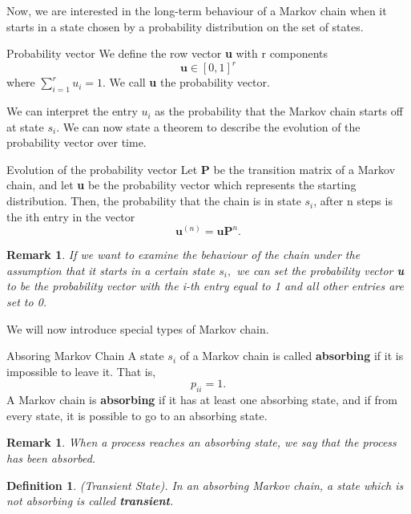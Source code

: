 \documentclass[twoside]{article}
\newtheorem{definition}[theorem]{Definition}
\newtheorem{remark}[theorem]{Remark}
\begin{document}
Now, we are interested in the long-term behaviour of a Markov chain when it starts in a state chosen by a probability distribution on the set of states. 

\begin{definition_exam}{Probability vector}{}
We define the row vector \textbf{u} with r components 
$$
\textbf{u} \in [0, 1]^r
$$
where $\sum_{i=1}^{r}u_i = 1$. We call \textbf{u} the probability vector.
\end{definition_exam}

We can interpret the entry $u_i$ as the probability that the Markov chain starts off at state $s_i.$ We can now state a theorem to describe the evolution of the probability vector over time.

\begin{theorem_exam}{Evolution of the probability vector}{} Let \textbf{P} be the transition matrix of a Markov chain, and let \textbf{u} be the probability vector which represents the starting distribution. Then, the probability that the chain is in state $s_i$, after n steps is the ith entry in the vector 
$$
\textbf{u}^{(n)} = \textbf{u}\textbf{P}^n.
$$
\end{theorem_exam}

\begin{remark} If we want to examine the behaviour of the chain under the assumption that it starts in a certain state $s_i,$ we can set the probability vector \textbf{u} to be the probability vector with the i-th entry equal to 1 and all other entries are set to 0.
\end{remark}

We will now introduce special types of Markov chain.

\begin{definition_exam}{Absoring Markov Chain}{} A state $s_i$ of a Markov chain is called \textbf{absorbing} if it is impossible to leave it. That is, 
$$
p_{ii} = 1.
$$
A Markov chain is \textbf{absorbing} if it has at least one absorbing state, and if from every state, it is possible to go to an absorbing state.
\end{definition_exam}

\begin{remark} When a process reaches an absorbing state, we say that the process has been absorbed.
\end{remark}

\begin{definition}(Transient State). In an absorbing Markov chain, a state which is not absorbing is called \textbf{transient}.
\end{definition}
\end{document}
